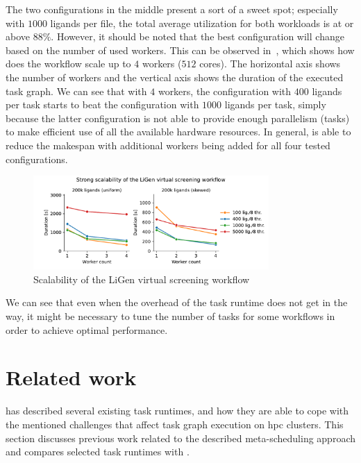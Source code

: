The two configurations in the middle present a sort of a sweet spot; especially with
$1000$ ligands per file, the total average utilization for both workloads is at or
above $88\%$. However, it should be noted that the best configuration will change
based on the number of used workers. This can be observed in~, which shows
how does the workflow scale up to $4$ workers ($512$ cores).
The horizontal axis shows the number of workers and the vertical axis shows the duration of the
executed task graph. We can see that with $4$ workers, the configuration with
$400$ ligands per task starts to beat the configuration with
$1000$ ligands per task, simply because the latter configuration is not able to
provide enough parallelism (tasks) to make efficient use of all the available hardware resources.
In general, \hyperqueue{} is able to reduce the makespan with additional workers being
added for all four tested configurations.

\begin{figure}[h]
	\centering
	\includegraphics[width=0.8\textwidth]{imgs/hq/charts/ligen-aggregation-scalability}
	\caption{Scalability of the LiGen virtual screening workflow}
	\label{fig:hq-ligen-scalability}
\end{figure}

We can see that even when the overhead of the task runtime does not get in the way, it might be
necessary to tune the number of tasks for some workflows in order to achieve optimal performance.


\section{Related work}
\label{hq:related-work}
 has described several existing task runtimes, and how they are able to cope
with the mentioned challenges that affect task graph execution on \gls{hpc} clusters.
This section discusses previous work related to the described meta-scheduling approach and compares
selected task runtimes with \hyperqueue{}.

